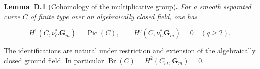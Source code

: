 \documentclass[11pt]{article}
\newenvironment{bpstatement}[2]{\par\addvspace{0.6\baselineskip}\noindent\textbf{#1}#2\textbf{.}\enspace\ignorespaces}
  {\par\addvspace{0.4\baselineskip}}
\newenvironment{bpstatementit}[2]{\begin{bpstatement}{#1}{#2}\itshape\ignorespaces}{\end{bpstatement}}
\begin{document}
\label{bp176}%
\begin{bpstatementit}{Lemma~D.1}{ (Cohomology of the multiplicative group)}
For a smooth separated curve \(C\) of finite type over an algebraically closed field, one has

\[
H^1(C,\nu_C^*\mathbf G_m)=\operatorname{Pic}(C),
\qquad
H^q(C,\nu_C^*\mathbf G_m)=0\quad(q\geq2).
\]

The identifications are natural under restriction and extension of the algebraically closed ground field. In particular \(\operatorname{Br}(C)=H^2(C_{\acute{e}t},\mathbf G_m)=0\).
\end{bpstatementit}
\end{document}
